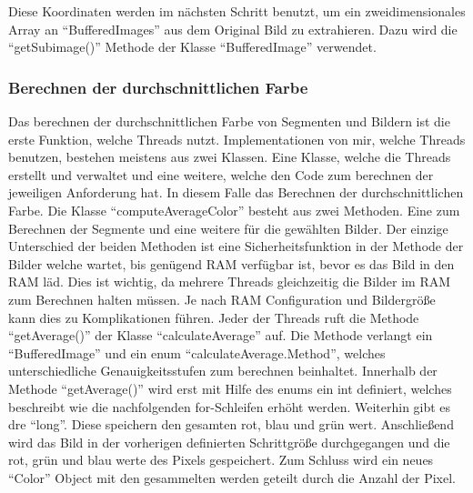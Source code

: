 Diese Koordinaten werden im nächsten Schritt benutzt, um ein zweidimensionales Array an ``BufferedImages'' aus dem Original Bild zu extrahieren. Dazu wird die ``getSubimage()'' Methode der Klasse ``BufferedImage'' verwendet.

\subsubsection{Berechnen der durchschnittlichen Farbe}
Das berechnen der durchschnittlichen Farbe von Segmenten und Bildern ist die erste Funktion, welche Threads nutzt. Implementationen von mir, welche Threads benutzen, bestehen meistens aus zwei Klassen. Eine Klasse, welche die Threads erstellt und verwaltet und eine weitere, welche den Code zum berechnen der jeweiligen Anforderung hat. In diesem Falle das Berechnen der durchschnittlichen Farbe. Die Klasse ``computeAverageColor'' besteht aus zwei Methoden. Eine zum Berechnen der Segmente und eine weitere für die gewählten Bilder. Der einzige Unterschied der beiden Methoden ist eine Sicherheitsfunktion in der Methode der Bilder welche wartet, bis genügend RAM verfügbar ist, bevor es das Bild in den RAM läd. Dies ist wichtig, da mehrere Threads gleichzeitig die Bilder im RAM zum Berechnen halten müssen. Je nach RAM Configuration und Bildergröße kann dies zu Komplikationen führen. Jeder der Threads ruft die Methode ``getAverage()'' der Klasse ``calculateAverage'' auf. Die Methode verlangt ein ``BufferedImage'' und ein enum ``calculateAverage.Method'', welches unterschiedliche Genauigkeitsstufen zum berechnen beinhaltet. Innerhalb der Methode ``getAverage()'' wird erst mit Hilfe des enums ein int definiert, welches beschreibt wie die nachfolgenden for-Schleifen erhöht werden. Weiterhin gibt es dre ``long''. Diese speichern den gesamten rot, blau und grün wert. Anschließend wird das Bild in der vorherigen definierten Schrittgröße durchgegangen und die rot, grün und blau werte des Pixels gespeichert. Zum Schluss wird ein neues ``Color'' Object mit den gesammelten werden geteilt durch die Anzahl der Pixel.

